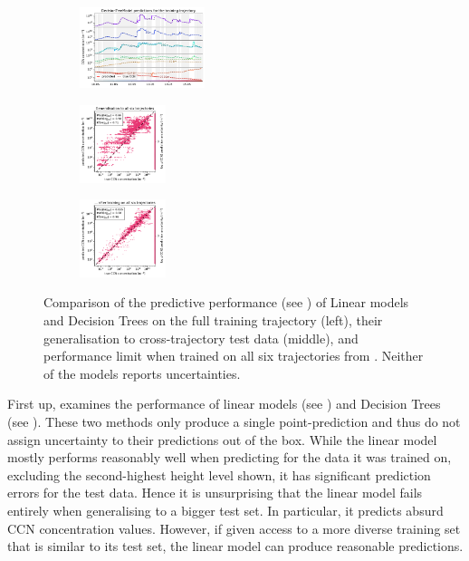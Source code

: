 \begin{figure}[H]
    \begin{subfigure}
    \centering
    \includegraphics[width=0.4\textwidth]{prediction/figures/models/decisiontreemodel-training-prediction.pdf}
    \end{subfigure}
    \begin{subfigure}
    \centering
    \includegraphics[width=0.275\textwidth]{prediction/figures/models/decisiontreemodel-test-generalisation.pdf}
    \end{subfigure}
    \begin{subfigure}
    \centering
    \includegraphics[width=0.275\textwidth]{prediction/figures/models/decisiontreemodel-test-prediction.pdf}
    \end{subfigure}
   
    \vspace{-1em}
    \caption[Predictive Performance of Linear models and Decision Trees]{Comparison of the predictive performance (see ) of Linear models and Decision Trees on the full training trajectory (left), their generalisation to cross-trajectory test data (middle), and performance limit when trained on all six trajectories from . Neither of the models reports uncertainties.}
    \label{fig:linear-tree-models}
\end{figure}

\noindent First up,  examines the performance of linear models (see ) and Decision Trees (see ). These two methods only produce a single point-prediction and thus do not assign uncertainty to their predictions out of the box. While the linear model mostly performs reasonably well when predicting for the data it was trained on, excluding the second-highest height level shown, it has significant prediction errors for the test data. Hence it is unsurprising that the linear model fails entirely when generalising to a bigger test set. In particular, it predicts absurd CCN concentration values. However, if given access to a more diverse training set that is similar to its test set, the linear model can produce reasonable predictions.

